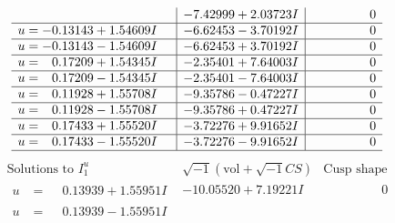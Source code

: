 \documentclass[1p]{elsarticle_modified}
\theoremstyle{definition}
\newcommand{\I}{\sqrt{-1}}
\begin{document}
$$\begin{array}{c|c|c}
 & -7.42999 + 2.03723 I & \phantom{-0.000000 } 0 \\ \hline\begin{aligned}
u &= -0.13143 + 1.54609 I\end{aligned}
 & -6.62453 - 3.70192 I & \phantom{-0.000000 } 0 \\ \hline\begin{aligned}
u &= -0.13143 - 1.54609 I\end{aligned}
 & -6.62453 + 3.70192 I & \phantom{-0.000000 } 0 \\ \hline\begin{aligned}
u &= \phantom{-}0.17209 + 1.54345 I\end{aligned}
 & -2.35401 + 7.64003 I & \phantom{-0.000000 } 0 \\ \hline\begin{aligned}
u &= \phantom{-}0.17209 - 1.54345 I\end{aligned}
 & -2.35401 - 7.64003 I & \phantom{-0.000000 } 0 \\ \hline\begin{aligned}
u &= \phantom{-}0.11928 + 1.55708 I\end{aligned}
 & -9.35786 - 0.47227 I & \phantom{-0.000000 } 0 \\ \hline\begin{aligned}
u &= \phantom{-}0.11928 - 1.55708 I\end{aligned}
 & -9.35786 + 0.47227 I & \phantom{-0.000000 } 0 \\ \hline\begin{aligned}
u &= \phantom{-}0.17433 + 1.55520 I\end{aligned}
 & -3.72276 + 9.91652 I & \phantom{-0.000000 } 0 \\ \hline\begin{aligned}
u &= \phantom{-}0.17433 - 1.55520 I\end{aligned}
 & -3.72276 - 9.91652 I & \phantom{-0.000000 } 0\\
 \hline 
 \end{array}$$\newpage$$\begin{array}{c|c|c}  
\text{Solutions to }I^u_{1}& \I (\text{vol} + \sqrt{-1}CS) & \text{Cusp shape}\\
 \hline 
\begin{aligned}
u &= \phantom{-}0.13939 + 1.55951 I\end{aligned}
 & -10.05520 + 7.19221 I & \phantom{-0.000000 } 0 \\ \hline\begin{aligned}
u &= \phantom{-}0.13939 - 1.55951 I\end{aligned}

\end{array}$$
\end{document}
